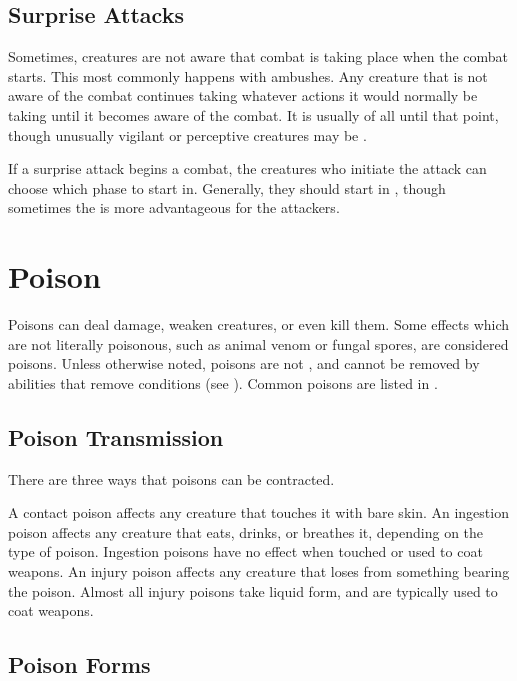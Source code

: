     \subsection{Surprise Attacks}\label{Surprise Attacks}
        Sometimes, creatures are not aware that combat is taking place when the combat starts.
        This most commonly happens with ambushes.
        Any creature that is not aware of the combat continues taking whatever actions it would normally be taking until it becomes aware of the combat.
        It is usually \unaware of all until that point, though unusually vigilant or perceptive creatures may be \partiallyunaware.

        If a surprise attack begins a combat, the creatures who initiate the attack can choose which phase to start in.
        Generally, they should start in , though sometimes the  is more advantageous for the attackers.

\section{Poison}\label{Poison}
    Poisons can deal damage, weaken creatures, or even kill them.
    Some effects which are not literally poisonous, such as animal venom or fungal spores, are considered poisons.
    Unless otherwise noted, poisons are not , and cannot be removed by abilities that remove conditions (see ).
    Common poisons are listed in .

    \subsection{Poison Transmission}\label{Poison Transmission}\label{Transmission}

        There are three ways that poisons can be contracted.

         A contact poison affects any creature that touches it with bare skin.
         An ingestion poison affects any creature that eats, drinks, or breathes it, depending on the type of poison.
        Ingestion poisons have no effect when touched or used to coat weapons.
         An injury poison affects any creature that loses  from something bearing the poison.
        Almost all injury poisons take liquid form, and are typically used to coat weapons.

    \subsection{Poison Forms}\label{Poison Forms}

